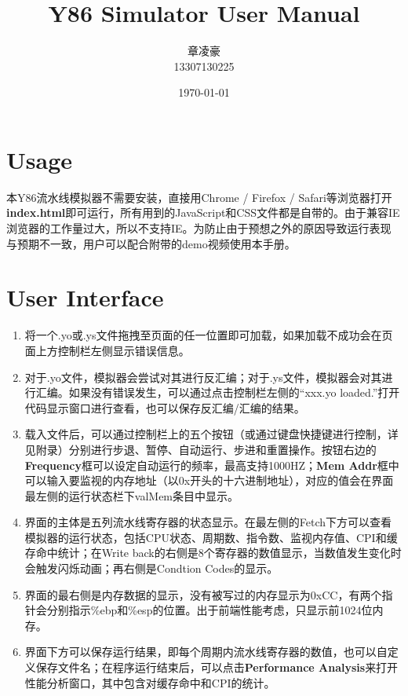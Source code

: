 \documentclass[12pt]{article}
\begin{document}
\pagestyle{fancy}
\lhead{\textbf{{\thetitle}}}
\rhead{\textbf{\nouppercase{\firstleftmark}}}
\cfoot{\thepage}

\title{\textbf{Y86 Simulator User Manual}}
\author{章凌豪\\13307130225}
\date{\today}
\maketitle


\vspace{42pt}

\section{Usage}

本Y86流水线模拟器不需要安装，直接用Chrome / Firefox / Safari等浏览器打开{\bf index.html}即可运行，所有用到的JavaScript和CSS文件都是自带的。由于兼容IE浏览器的工作量过大，所以不支持IE。为防止由于预想之外的原因导致运行表现与预期不一致，用户可以配合附带的demo视频使用本手册。

\section{User Interface}

\begin{enumerate}
\item 将一个.yo或.ys文件拖拽至页面的任一位置即可加载，如果加载不成功会在页面上方控制栏左侧显示错误信息。
\item 对于.yo文件，模拟器会尝试对其进行反汇编；对于.ys文件，模拟器会对其进行汇编。如果没有错误发生，可以通过点击控制栏左侧的“xxx.yo loaded.”打开代码显示窗口进行查看，也可以保存反汇编/汇编的结果。
\item 载入文件后，可以通过控制栏上的五个按钮（或通过键盘快捷键进行控制，详见附录）分别进行步退、暂停、自动运行、步进和重置操作。按钮右边的{\bf Frequency}框可以设定自动运行的频率，最高支持1000HZ；{\bf Mem Addr}框中可以输入要监视的内存地址（以0x开头的十六进制地址），对应的值会在界面最左侧的运行状态栏下valMem条目中显示。
\item 界面的主体是五列流水线寄存器的状态显示。在最左侧的Fetch下方可以查看模拟器的运行状态，包括CPU状态、周期数、指令数、监视内存值、CPI和缓存命中统计；在Write back的右侧是8个寄存器的数值显示，当数值发生变化时会触发闪烁动画；再右侧是Condtion Codes的显示。
\item 界面的最右侧是内存数据的显示，没有被写过的内存显示为0xCC，有两个指针会分别指示\%ebp和\%esp的位置。出于前端性能考虑，只显示前1024位内存。
\item 界面下方可以保存运行结果，即每个周期内流水线寄存器的数值，也可以自定义保存文件名；在程序运行结束后，可以点击{\bf Performance Analysis}来打开性能分析窗口，其中包含对缓存命中和CPI的统计。
\end{enumerate}
\end{document}

